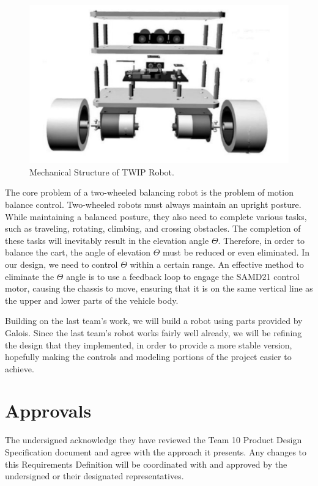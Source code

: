 \documentclass[a4paper,12pt]{article}
\begin{document}
 \begin{figure}[H]
\includegraphics[width = \textwidth]{images/PDS_Robot.png}
\caption{Mechanical Structure of TWIP Robot.}
	\end{figure}
\par
The core problem of a two-wheeled balancing robot is the problem of motion balance control. Two-wheeled robots must always maintain an upright posture. While maintaining a balanced posture, they also need to complete various tasks, such as traveling, rotating, climbing, and crossing obstacles. The completion of these tasks will inevitably result in the elevation angle $\Theta$. Therefore, in order to balance the cart, the angle of elevation $\Theta$ must be reduced or even eliminated. In our design, we need to control $\Theta$ within a certain range. An effective method to eliminate the $\Theta$ angle is to use a feedback loop to engage the SAMD21 control motor, causing the chassis to move, ensuring that it is on the same vertical line as the upper and lower parts of the vehicle body.\par

Building on the last team's work, we will build a robot using parts provided by Galois. Since the last team's robot works fairly well already, we will be refining the design that they implemented, in order to provide a more stable version, hopefully making the controls and modeling portions of the project easier to achieve.

\newpage
\section{Approvals}
The undersigned acknowledge they have reviewed the Team 10 Product Design Specification document and agree with the approach it presents. Any changes to this Requirements Definition will be coordinated with and approved by the undersigned or their designated representatives.
\end{document}
